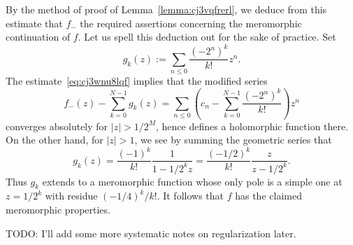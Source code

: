 \documentclass[reqno]{amsart}  \numberwithin{theorem}{section} \numberwithin{equation}{section}
\begin{document}
\begin{example}
By the method of proof of Lemma~\ref{lemma:cj3vqfrerl}, we deduce from this estimate that $f_-$ the required assertions concerning the meromorphic continuation of $f$.  Let us spell this deduction out for the sake of practice.  Set
\begin{equation*}
 g_k(z) := 
  \sum_{n \leq 0}
  \frac{{(-2^n)}^k}{k!} z^n.
\end{equation*}
The estimate~\eqref{eq:cj3wnu8lqf} implies that the modified series
\begin{equation}\label{eq:cj3wnu7518}
   f_-(z)
  -
  \sum_{k = 0}^{N-1}
  g_k(z)
  = 
  \sum_{n \leq 0}
  \left( c_n -
    \sum_{k = 0}^{N-1} \frac{{(-2^n)}^k}{k!}
  \right) z^n
\end{equation}
converges absolutely for $\lvert z \rvert > 1 / 2^M$, hence defines a holomorphic function there.  On the other hand, for $\lvert z \rvert > 1$, we see by summing the geometric series that
\begin{equation*}
  g_k(z)
  =
  \frac{{(-1)}^k}{k!}
  \frac{1}{1 - 1 / 2^k z}
  =
  \frac{{(-1/2)}^k}{k!}
  \frac{z}{z - 1 / 2^k}.
\end{equation*}
Thus $g_k$ extends to a meromorphic function whose only pole is a simple one at $z = 1/2^k$ with residue ${(-1/4)}^k  / k!$.  It follows that $f$ has the claimed meromorphic properties.
\end{example}

TODO: I'll add some more systematic notes on regularization later.
\end{document}
